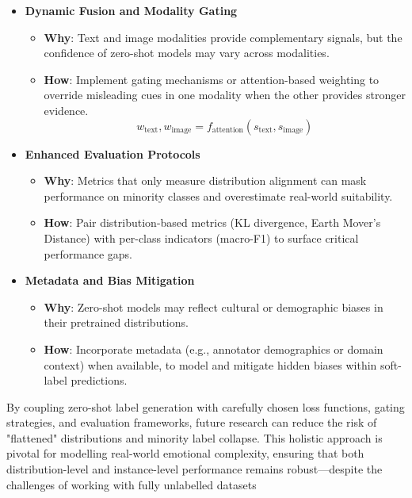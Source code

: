 \begin{itemize}
    \item \textbf{Dynamic Fusion and Modality Gating}
    \begin{itemize}
        \item \textbf{Why}: Text and image modalities provide complementary signals, but the confidence of zero-shot models may vary across modalities.
        \item \textbf{How}: Implement gating mechanisms or attention-based weighting to override misleading cues in one modality when the other provides stronger evidence.
        \begin{equation}
            w_{\text{text}}, w_{\text{image}} = f_{\text{attention}}(s_{\text{text}}, s_{\text{image}})
        \end{equation}
    \end{itemize}
    
    \item \textbf{Enhanced Evaluation Protocols}
    \begin{itemize}
        \item \textbf{Why}: Metrics that only measure distribution alignment can mask performance on minority classes and overestimate real-world suitability.
        \item \textbf{How}: Pair distribution-based metrics (KL divergence, Earth Mover’s Distance) with per-class indicators (macro-F1) to surface critical performance gaps.
    \end{itemize}
    
    \item \textbf{Metadata and Bias Mitigation}
    \begin{itemize}
        \item \textbf{Why}: Zero-shot models may reflect cultural or demographic biases in their pretrained distributions.
        \item \textbf{How}: Incorporate metadata (e.g., annotator demographics or domain context) when available, to model and mitigate hidden biases within soft-label predictions.
    \end{itemize}
\end{itemize}

By coupling zero-shot label generation with carefully chosen loss functions, gating strategies, and evaluation frameworks, future research can reduce the risk of "flattened" distributions and minority label collapse. This holistic approach is pivotal for modelling real-world emotional complexity, ensuring that both distribution-level and instance-level performance remains robust—despite the challenges of working with fully unlabelled datasets



